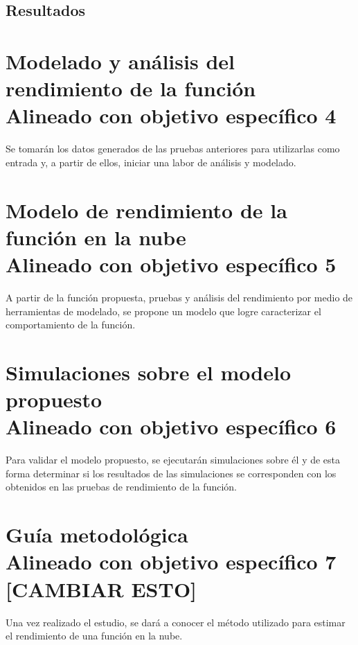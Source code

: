 \subsection{Resultados}


\section[Modelado y análisis del rendimiento de la función]{Modelado y análisis del rendimiento de la función\\\small{Alineado con objetivo específico 4}}
Se tomarán los datos generados de las pruebas anteriores para utilizarlas como entrada y, a partir de ellos, iniciar una labor de análisis y modelado.

\section[Modelo de rendimiento de la función en la nube]{Modelo de rendimiento de la función en la nube\\\small{Alineado con objetivo específico 5}}
A partir de la función propuesta, pruebas y análisis del rendimiento por medio de herramientas de modelado, se propone un modelo que logre caracterizar el comportamiento de la función.

\section[Simulaciones sobre el modelo propuesto]{Simulaciones sobre el modelo propuesto\\\small{Alineado con objetivo específico 6}}
Para validar el modelo propuesto, se ejecutarán simulaciones sobre él y de esta forma determinar si los resultados de las simulaciones se corresponden con los obtenidos en las pruebas de rendimiento de la función.

\section[Guía metodológica]{Guía metodológica\\\small{Alineado con objetivo específico 7 [CAMBIAR ESTO]}}
Una vez realizado el estudio, se dará a conocer el método utilizado para estimar el rendimiento de una función en la nube. 